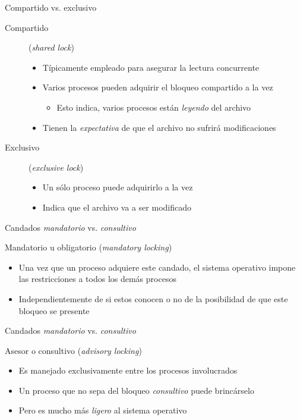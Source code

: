 \documentclass[presentation]{beamer}
\begin{document}
\begin{frame}[label={sec:org35bce91}]{Compartido vs. exclusivo}
\begin{description}
\item[{Compartido}] (\emph{shared lock})
\begin{itemize}
\item Típicamente empleado para asegurar la lectura concurrente
\item Varios procesos pueden adquirir el bloqueo compartido a la vez
\begin{itemize}
\item Esto indica, varios procesos están \emph{leyendo} del archivo
\end{itemize}
\item Tienen la \emph{expectativa} de que el archivo no sufrirá modificaciones
\end{itemize}
\item[{Exclusivo}] (\emph{exclusive lock})
\begin{itemize}
\item Un sólo proceso puede adquirirlo a la vez
\item Indica que el archivo va a ser modificado
\end{itemize}
\end{description}
\end{frame}

\begin{frame}[label={sec:orgccf6ea0}]{Candados \emph{mandatorio} vs. \emph{consultivo}}
\begin{center}
Mandatorio u obligatorio (\emph{mandatory locking})
\end{center}
\begin{itemize}
\item Una vez que un proceso adquiere este candado, el sistema operativo
impone las restricciones a todos los demás procesos
\item Independientemente de si estos conocen o no de la posibilidad de
que este bloqueo se presente
\end{itemize}
\end{frame}

\begin{frame}[label={sec:org265b8d0}]{Candados \emph{mandatorio} vs. \emph{consultivo}}
\begin{center}
Asesor o consultivo (\emph{advisory locking})
\end{center}
\begin{itemize}
\item Es manejado exclusivamente entre los procesos involucrados
\item Un proceso que no sepa del bloqueo \emph{consultivo} puede brincárselo
\item Pero es mucho más \emph{ligero} al sistema operativo
\end{itemize}
\end{frame}
\end{document}
